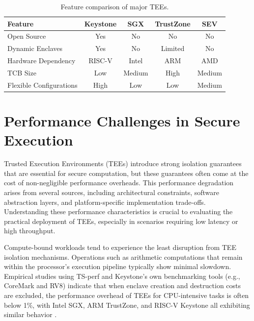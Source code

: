 \begin{table}[htbp]
\centering
\caption{Feature comparison of major TEEs.}
\label{tab:tee-features}
\begin{tabular}{@{}lcccc@{}}
\toprule
\textbf{Feature} & \textbf{Keystone} & \textbf{SGX} & \textbf{TrustZone} & \textbf{SEV} \\
\midrule
Open Source & Yes & No & No & No \\
Dynamic Enclaves & Yes & No & Limited & No \\
Hardware Dependency & RISC-V & Intel & ARM & AMD \\
TCB Size & Low & Medium & High & Medium \\
Flexible Configurations & High & Low & Low & Medium \\
\bottomrule
\end{tabular}
\end{table}


\section{Performance Challenges in Secure Execution}

Trusted Execution Environments (TEEs) introduce strong isolation guarantees that are essential for secure computation, but these guarantees often come at the cost of non-negligible performance overheads. This performance degradation arises from several sources, including architectural constraints, software abstraction layers, and platform-specific implementation trade-offs. Understanding these performance characteristics is crucial to evaluating the practical deployment of TEEs, especially in scenarios requiring low latency or high throughput.

Compute-bound workloads tend to experience the least disruption from TEE isolation mechanisms. Operations such as arithmetic computations that remain within the processor’s execution pipeline typically show minimal slowdown. Empirical studies using TS-perf and Keystone’s own benchmarking tools (e.g., CoreMark and RV8) indicate that when enclave creation and destruction costs are excluded, the performance overhead of TEEs for CPU-intensive tasks is often below 1\%, with Intel SGX, ARM TrustZone, and RISC-V Keystone all exhibiting similar behavior \cite{suzaki2021tsperf,Lee2019}.

